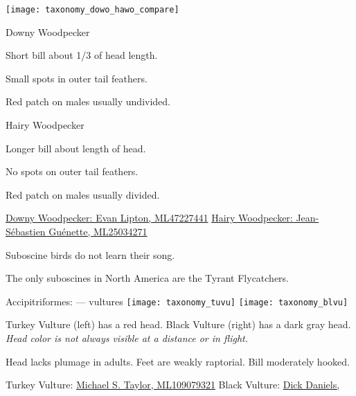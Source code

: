 \documentclass[t]{beamer}
\begin{document}
\begin{frame}

\texttt{[image: taxonomy\_dowo\_hawo\_compare]}

\vspace{-\baselineskip}

\begin{multicols}{2}

Downy Woodpecker

\medskip

Short bill about 1/3 of head length.

\smallskip

Small spots in outer tail feathers.

\smallskip

Red patch on males usually undivided.


\columnbreak

Hairy Woodpecker

\medskip

Longer bill about length of head.

\smallskip

No spots on outer tail feathers.

\smallskip

Red patch on males usually divided.

\end{multicols}


\vfilll

\tiny \href{https://macaulaylibrary.org/asset/47227441}{Downy Woodpecker: Evan Lipton, ML47227441} \hfill \href{https://macaulaylibrary.org/asset/25034271}{Hairy Woodpecker: Jean-Sébastien Guénette, ML25034271}

\end{frame}




\begin{frame}{Suboscine birds do not learn their song.}

The only suboscines in North America are the Tyrant Flycatchers.

\end{frame}


\begin{frame}{Accipitriformes:  — vultures}
\texttt{[image: taxonomy\_tuvu]}\hfill
\texttt{[image: taxonomy\_blvu]}

Turkey Vulture (left) has a red head. Black Vulture (right) has a dark gray head. \emph{Head color is not always visible at a distance or in flight.}

\vspace{0.5\baselineskip}

Head lacks plumage in adults. Feet are weakly raptorial. Bill moderately hooked.

\vfilll

\tiny Turkey Vulture:   \href{https://macaulaylibrary.org/asset/109079321}{Michael S. Taylor, ML109079321}\hfill
Black Vulture: \href{https://commons.wikimedia.org/wiki/File:Vulture,_Black_FG1.jpg}{Dick Daniels, }
\end{frame}
\end{document}
